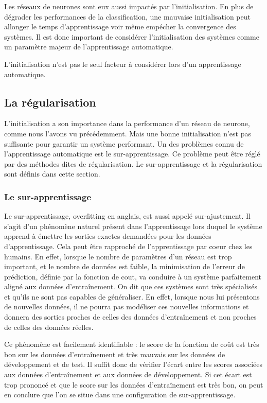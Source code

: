 Les réseaux de neurones sont eux aussi impactés par l'initialisation. En plus de dégrader les performances de la classification, une mauvaise initialisation peut allonger le temps d'apprentissage voir même empécher la convergence des systèmes. Il est donc important de considérer l’initialisation des systèmes comme un paramètre majeur de l'apprentissage automatique.

L’initialisation n'est pas le seul facteur à considérer lors d'un apprentissage automatique.

\subsection{La régularisation}
L’initialisation a son importance dans la performance d'un réseau de neurone, comme nous l'avons vu précédemment. Mais une bonne initialisation n'est pas suffisante pour garantir un système performant. Un des problèmes connu de l'apprentissage automatique est le sur-apprentissage. Ce problème peut être réglé par des méthodes dites de régularisation. Le sur-apprentissage et la régularisation sont définis dans cette section.

\subsubsection{Le sur-apprentissage}
Le sur-apprentissage, overfitting en anglais, est aussi appelé sur-ajustement. Il s'agit d'un phénomène naturel présent dans l'apprentissage lors duquel le système apprend à émettre les sorties exactes demandées pour les données d'apprentissage. Cela peut être rapproché de l'apprentissage par coeur chez les humains. En effet, lorsque le nombre de paramètres d'un réseau est trop important, et le nombre de données est faible, la minimisation de l'erreur de prédiction, définie par la fonction de cout, va conduire à un système parfaitement aligné aux données d’entraînement. On dit que ces systèmes sont très spécialisés et qu'ils ne sont pas capables de généraliser. En effet, lorsque nous lui présentons de nouvelles données, il ne pourra pas modéliser ces nouvelles informations et donnera des sorties proches de celles des données d’entraînement et non proches de celles des données réelles.

Ce phénomène est facilement identifiable : le score de la fonction de coût est très bon sur les données d’entraînement et très mauvais sur les données de développement et de test. Il suffit donc de vérifier l'écart entre les scores associées aux données d’entraînement et aux données de développement.  Si cet écart est trop prononcé et que le score sur les données d’entraînement est très bon, on peut en conclure que l'on se situe dans une configuration de sur-apprentissage.


